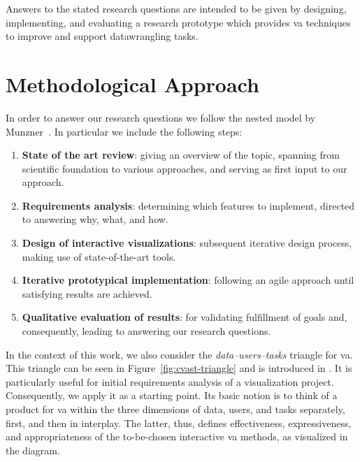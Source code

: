 Answers to the stated research questions are intended to be given by designing, implementing, and evaluating a research prototype which provides \gls{va} techniques to improve and support \gls{datawrangling} tasks.


\section{Methodological Approach}

In order to answer our research questions we follow the nested model by Munzner~\cite{Munzner2009}. In particular we include the following steps:

\begin{enumerate}
  \item \textbf{State of the art review}: giving an overview of the topic, spanning from scientific foundation to various approaches, and serving as first input to our approach.
  \item \textbf{Requirements analysis}: determining which features to implement, directed to answering why, what, and how.
  \item \textbf{Design of interactive visualizations}: subsequent iterative design process, making use of state-of-the-art tools.
  \item \textbf{Iterative prototypical implementation}: following an agile approach until satisfying results are achieved.
  \item \textbf{Qualitative evaluation of results}: for validating fulfillment of goals and, consequently, leading to answering our research questions.
\end{enumerate}

In the context of this work, we also consider the \emph{data--users--tasks} triangle for \gls{va}.
This triangle can be seen in Figure~\ref{fig:cvast-triangle} and is introduced in \cite{Miksch2014}.
It is particularly useful for initial requirements analysis of a visualization project.
Consequently, we apply it as a starting point.
Its basic notion is to think of a product for \gls{va} within the three dimensions of data, users, and tasks separately, first, and then in interplay.
The latter, thus, defines effectiveness, expressiveness, and appropriateness of the to-be-chosen interactive \gls{va} methods, as visualized in the diagram.

